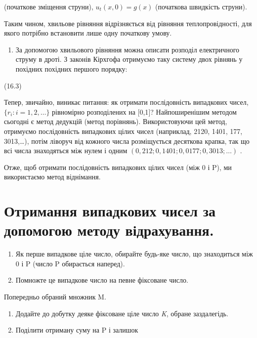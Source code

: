 \documentclass[
  ukrainian,
]{article}
\providecommand{\tightlist}{%
  \setlength{\itemsep}{0pt}\setlength{\parskip}{0pt}}
\begin{document}
(початкове зміщення струни), \(u_t(x, 0) = g(x)\) (початкова швидкість
струни).

Таким чином, хвильове рівняння відрізняється від рівняння
теплопровідності, для якого потрібно встановити лише одну початкову
умову.

\begin{enumerate}
\def\labelenumi{\arabic{enumi}.}
\setcounter{enumi}{3}
\tightlist
\item
  За допомогою хвильового рівняння можна описати розподіл електричного
  струму в дроті. З законів Кірхгофа отримуємо таку систему двох рівнянь
  у похідних похідних першого порядку:
\end{enumerate}

(16.3)

Тепер, звичайно, виникає питання: як отримати послідовність випадкових
чисел, \(\{r_i: i=1,2,\ldots\}\) рівномірно розподілених на {[}0,1{]}?
Найпоширенішим методом сьогодні є метод дедукцій (метод порівнянь).
Використовуючи цей метод, отримуємо послідовність випадкових цілих чисел
(наприклад, 2120, 1401, 177, 3013,\ldots), потім ліворуч від кожного
числа розміщується десяткова крапка, так що всі числа знаходяться між
нулем і одним \((0,212; 0,1401; 0,0177; 0,3013; \ldots)\) .

Отже, щоб отримати послідовність випадкових цілих чисел (між 0 і P), ми
використаємо метод віднімання.

\section{Отримання випадкових чисел за допомогою методу
відрахування.}\label{ux43eux442ux440ux438ux43cux430ux43dux43dux44f-ux432ux438ux43fux430ux434ux43aux43eux432ux438ux445-ux447ux438ux441ux435ux43b-ux437ux430-ux434ux43eux43fux43eux43cux43eux433ux43eux44e-ux43cux435ux442ux43eux434ux443-ux432ux456ux434ux440ux430ux445ux443ux432ux430ux43dux43dux44f.}

\begin{enumerate}
\def\labelenumi{\arabic{enumi}.}
\item
  Як перше випадкове ціле число, обирайте будь-яке число, що знаходиться
  між 0 і P (число P обирається наперед).
\item
  Помножте це випадкове число на певне фіксоване число.
\end{enumerate}

Попередньо обраний множник M.

\begin{enumerate}
\def\labelenumi{\arabic{enumi}.}
\setcounter{enumi}{2}
\item
  Додайте до добутку деяке фіксоване ціле число \emph{K}, обране
  заздалегідь.
\item
  Поділити отриману суму на P і залишок
\end{enumerate}
\end{document}
